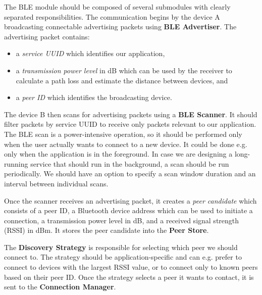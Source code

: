 The BLE module should be composed of several submodules with clearly separated responsibilities. The communication begins by the device A broadcasting connectable advertising packets using \textbf{BLE Advertiser}. The advertising packet contains:

\begin{itemize}
    \item a \textit{service UUID} which identifies our application,
    \item a \textit{transmission power level} in dB which can be used by the receiver to calculate a path loss and estimate the distance between devices, and
    \item a \textit{peer ID} which identifies the broadcasting device.
\end{itemize}

The device B then scans for advertising packets using a \textbf{BLE Scanner}. It should filter packets by service UUID to receive only packets relevant to our application. The BLE scan is a power-intensive operation, so it should be performed only when the user actually wants to connect to a new device. It could be done e.g. only when the application is in the foreground. In case we are designing a long-running service that should run in the background, a scan should be run periodically. We should have an option to specify a scan window duration and an interval between individual scans.

Once the scanner receives an advertising packet, it creates a \textit{peer candidate} which consists of a peer ID, a Bluetooth device address which can be used to initiate a connection, a transmission power level in dB, and a received signal strength (RSSI) in dBm. It stores the peer candidate into the \textbf{Peer Store}.

The \textbf{Discovery Strategy} is responsible for selecting which peer we should connect to. The strategy should be application-specific and can e.g. prefer to connect to devices with the largest RSSI value, or to connect only to known peers based on their peer ID. Once the strategy selects a peer it wants to contact, it is sent to the \textbf{Connection Manager}.

